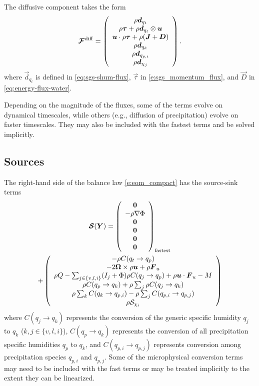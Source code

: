 \documentclass{article}
\begin{document}
{ The diffusive component takes the form 
 \begin{equation}
 \boldsymbol{{\mathcal{F}}}^{\mathrm{diff}}=\left( \begin{array}{c}
 \rho\boldsymbol{{d}}_{q_t} \\
 \rho\boldsymbol{{\tau}} + \rho\boldsymbol{{d}}_{q_t} \otimes \boldsymbol{{u}}\\
 \boldsymbol{{u}} \cdot \rho\boldsymbol{{\tau}} + \rho (\boldsymbol{{J}} + \boldsymbol{{D}}) \\
\rho\boldsymbol{{d}}_{q_k}\\
\rho \boldsymbol{{d}}_{q_{p, i}}\\
\rho \boldsymbol{{d}}_{\chi_j}
\end{array}
\right).
\label{eq:diff_flux}
\end{equation}
where $\vec{d}_{q_t}$ is defined in \eqref{eq:sgs-shum-flux}, $\vec{\tau}$ in \eqref{e:sgs_momentum_flux}, and $\vec{D}$ in \eqref{eq:energy-flux-water}.

Depending on the magnitude of the fluxes, some of the terms evolve on dynamical timescales, while others (e.g., diffusion of precipitation) evolve on faster timescales. They may also be included with the fastest terms and be solved implicitly.
\subsection{Sources}

The right-hand side of the balance law \eqref{e:eom_compact} has the source-sink terms
\begin{multline}
\boldsymbol{{\mathcal{S}}}(\boldsymbol{{Y}})=  \left( 
\begin{array}{c}
 \boldsymbol{{0}} \\
  -\rho \nabla\Phi \\
 \boldsymbol{{0}} \\
\boldsymbol{{0}} \\
\boldsymbol{{0}} \\
\boldsymbol{{0}}
\end{array}
\right)_{\mathrm{fastest}} \\
+ \left( \begin{array}{c}
 -\rho C(q_t \rightarrow q_p) \\
 - 2 \boldsymbol{{\Omega}} \times \rho\boldsymbol{{u}}  + \rho \boldsymbol{{F}}_u \\
 \rho Q - \sum_{j\in\{v,l,i\}} (I_j + \Phi)  \rho C(q_j \rightarrow q_p) + \rho \boldsymbol{{u}} \cdot \boldsymbol{{F}}_u - M \\
\rho C(q_p \rightarrow q_k) + \rho \sum_j \rho C(q_j \rightarrow q_k) \\
\rho \sum_k C(q_k \rightarrow q_{p, i}) - \rho \sum_j C(q_{p, i} \rightarrow q_{p, j})\\
\rho \mathcal{S}_{\chi_i}
\end{array}
\right)
\label{eq:source}
\end{multline}
where $C(q_j \rightarrow q_k)$ represents the conversion of the generic specific humidity $q_j$ to $q_k$ ($k, j \in \{v, l, i\}$), $C(q_p \rightarrow q_k)$ represents the conversion of all precipitation specific humidities $q_p$ to $q_k$, and $C(q_{p, i} \rightarrow q_{p, j})$ represents conversion among precipitation species $q_{p, i}$ and $q_{p, j}$. Some of the microphysical conversion terms may need to be included with the fast terms or may be treated implicitly to the extent they can be linearized.

}
\end{document}
